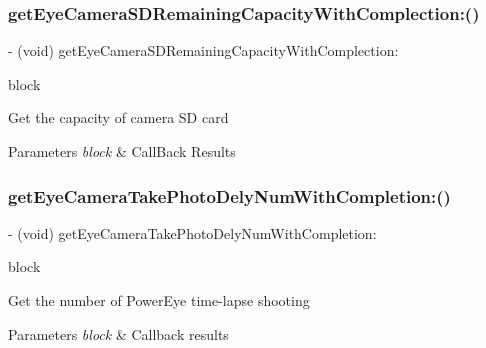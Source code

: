 \subsubsection{\texorpdfstring{get\+Eye\+Camera\+S\+D\+Remaining\+Capacity\+With\+Complection\+:()}{getEyeCameraSDRemainingCapacityWithComplection:()}}
{\footnotesize\ttfamily -\/ (void) get\+Eye\+Camera\+S\+D\+Remaining\+Capacity\+With\+Complection\+: \begin{DoxyParamCaption}\item[{(void($^\wedge$)(N\+S\+Integer remaining\+Capacity, N\+S\+Error $\ast$\+\_\+\+Nullable error))}]{block }\end{DoxyParamCaption}}

Get the capacity of camera SD card


\begin{DoxyParams}{Parameters}
{\em block} & Call\+Back Results \\
\hline
\end{DoxyParams}
\mbox{\label{interface_p_v_eye_camera_a003a47e3f9642333ad2412399d66db51}} 
\subsubsection{\texorpdfstring{get\+Eye\+Camera\+Take\+Photo\+Dely\+Num\+With\+Completion\+:()}{getEyeCameraTakePhotoDelyNumWithCompletion:()}}
{\footnotesize\ttfamily -\/ (void) get\+Eye\+Camera\+Take\+Photo\+Dely\+Num\+With\+Completion\+: \begin{DoxyParamCaption}\item[{(void($^\wedge$)(N\+S\+Integer num, N\+S\+Error $\ast$\+\_\+\+Nullable error))}]{block }\end{DoxyParamCaption}}

Get the number of Power\+Eye time-\/lapse shooting


\begin{DoxyParams}{Parameters}
{\em block} & Callback results \\
\hline
\end{DoxyParams}
\mbox{\label{interface_p_v_eye_camera_a97e7027e7ec343e628c7947301cb5679}} 
